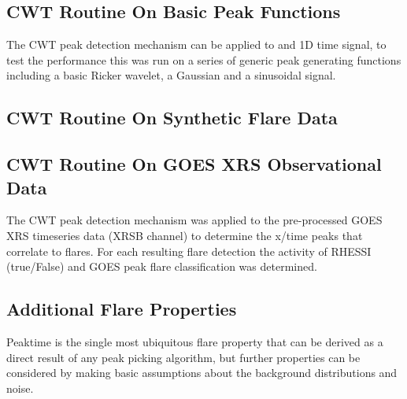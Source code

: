 \documentclass[namedreferences]{solarphysics}
\begin{document}
\begin{article}
\color{black}


\subsection{CWT Routine On Basic Peak Functions} %
\label{SS-cwt-basic-functions}

The CWT peak detection mechanism can be applied to and 1D time signal, to test the performance this was run on a series of generic peak generating functions including a basic Ricker wavelet, a Gaussian and a sinusoidal signal.


\subsection{CWT Routine On Synthetic Flare Data} %
\label{SS-cwt-synthetic-data}


\subsection{CWT Routine On GOES XRS Observational Data} %
\label{SS-cwt-goes-xrs}

The CWT peak detection mechanism was applied to the pre-processed GOES XRS timeseries data (XRSB channel) to determine the x/time peaks that correlate to flares.
For each resulting flare detection the activity of RHESSI (true/False) and GOES peak flare classification was determined.


\subsection{Additional Flare Properties} %
\label{SS-additional-flare-properties}

Peaktime is the single most ubiquitous flare property that can be derived as a direct result of any peak picking algorithm, but further properties can be considered by making basic assumptions about the background distributions and noise.


\end{article}
\end{document}
